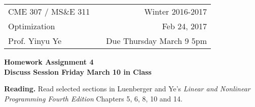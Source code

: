 \documentclass[12pt,letterpaper]{article}
\begin{document}
\pagestyle{empty}
\def \NATUR{ I \hspace*{-0.8ex} N}
\def \REALES{ I \hspace*{-0.8ex} R}
\renewcommand{\labelenumi}{\alph{enumi})}
\renewcommand{\labelenumii}{\roman{enumii})}

\hspace{-6mm}
\begin{tabular}{lcr}
CME 307 / MS\&E 311 & \hspace{3in} & Winter 2016-2017 \\ Optimization & & Feb 24, 2017 \\
Prof. Yinyu Ye & & Due Thursday March 9 5pm
\end{tabular}

\bigskip

\begin{center}
{\large \bf Homework Assignment 4 \\  Discuss Session Friday March 10 in Class}
\end{center}


\bigskip

{\textbf{Reading.}} Read selected sections in Luenberger and Ye's {\sl Linear
and Nonlinear Programming Fourth Edition} Chapters 5, 6, 8, 10 and 14.
\end{document}
